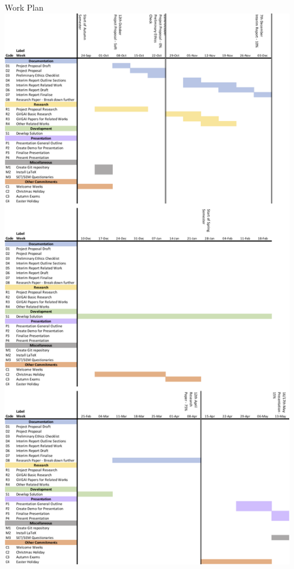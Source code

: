 \documentclass[a4paper]{article}
\begin{document}
\clearpage
\begin{center}
    \Large{Work Plan}\\
\includegraphics[height=24.8cm]{workPlan.png}
\end{center}
\end{document}
